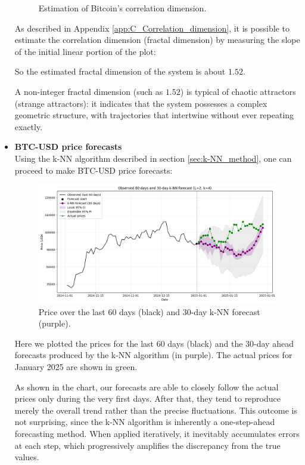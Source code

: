 \begin{itemize}
\begin{figure}[H]
\begin{subfigure}[t]{0.49\textwidth}
            \label{fig:correlation_dimension}
        \end{subfigure}
        \caption{Estimation of Bitcoin’s correlation dimension.}
        \label{fig:dimension_estimation}
    \end{figure}
    
    As described in Appendix \ref{app:C_Correlation_dimension}, it is possible to estimate the correlation dimension (fractal dimension) by measuring the slope of the initial linear portion of the plot:
    
    So the estimated fractal dimension of the system is about $1.52$.
    
    A non-integer fractal dimension (such as $1.52$) is typical of chaotic attractors (strange attractors): it indicates that the system possesses a complex geometric structure, with trajectories that intertwine without ever repeating exactly.
    
    \item \textbf{BTC-USD price forecasts}\\
    Using the k-NN algorithm described in section \ref{sec:k-NN_method}, one can proceed to make BTC-USD price forecasts:
    \begin{figure} [H]
        \centering
        \includegraphics[width=1\linewidth]{img/forecast.png}
        \caption{Price over the last 60 days (black) and 30-day k-NN forecast (purple).}
    \end{figure}
    Here we plotted the prices for the last 60 days (black) and the 30-day ahead forecasts produced by the k-NN algorithm (in purple). The actual prices for January 2025 are shown in green.
    
   As shown in the chart, our forecasts are able to closely follow the actual prices only during the very first days. After that, they tend to reproduce merely the overall trend rather than the precise fluctuations. This outcome is not surprising, since the k-NN algorithm is inherently a one-step-ahead forecasting method. When applied iteratively, it inevitably accumulates errors at each step, which progressively amplifies the discrepancy from the true values.\\
   

\end{itemize}
